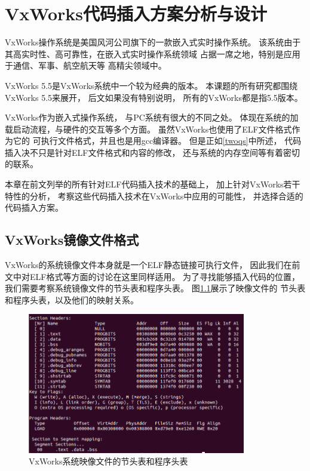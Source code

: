 \chapter{VxWorks代码插入方案分析与设计}

VxWorks操作系统是美国风河公司旗下的一款嵌入式实时操作系统。
该系统由于其高实时性、高可靠性，在嵌入式实时操作系统领域
占据一席之地，特别是应用于通信、军事、航空航天等
高精尖领域中。

VxWorks 5.5是VxWorks系统中一个较为经典的版本。
本课题的所有研究都围绕VxWorks 5.5来展开，
后文如果没有特别说明，
所有的VxWorks都是指5.5版本。

VxWorks作为嵌入式操作系统，
与PC系统有很大的不同之处。
体现在系统的加载启动流程，与硬件的交互等多个方面。
虽然VxWorks也使用了ELF文件格式作为它的
可执行文件格式，并且也是用gcc编译器。
但是正如\ref{twoqs}中所述，
代码插入决不只是针对ELF文件格式和内容的修改，
还与系统的内存空间等有着密切的联系。

本章在前文列举的所有针对ELF代码插入技术的基础上，
加上针对VxWorks若干特性的分析，
考察这些代码插入技术在VxWorks中应用的可能性，
并选择合适的代码插入方案。


\section{VxWorks镜像文件格式}

VxWorks的系统镜像文件本身就是一个ELF静态链接可执行文件，
因此我们在前文中对ELF格式等方面的讨论在这里同样适用。
为了寻找能够插入代码的位置，
我们需要考察系统镜像文件的节头表和程序头表。
图\ref{shtandpht}展示了映像文件的
节头表和程序头表，以及他们的映射关系。

\begin{figure}[h!]
    \centering
    \includegraphics[width=0.85\textwidth]{figure/shtandpht.png}
    \caption{VxWorks系统映像文件的节头表和程序头表}
    \label{shtandpht}
\end{figure}

